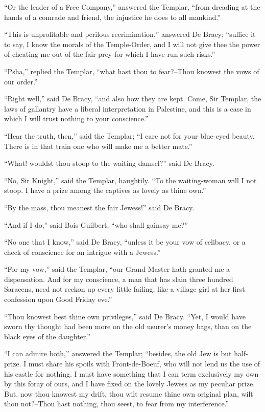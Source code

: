 ``Or the leader of a Free Company,'' answered the Templar, ``from
dreading at the hands of a comrade and friend, the injustice he does to
all mankind.''

``This is unprofitable and perilous recrimination,'' answered De Bracy;
``suffice it to say, I know the morals of the Temple-Order, and I will
not give thee the power of cheating me out of the fair prey for which I
have run such risks.''

``Psha,'' replied the Templar, ``what hast thou to fear?--Thou knowest
the vows of our order.''

``Right well,'' said De Bracy, ``and also how they are kept. Come, Sir
Templar, the laws of gallantry have a liberal interpretation in
Palestine, and this is a case in which I will trust nothing to your
conscience.''

``Hear the truth, then,'' said the Templar; ``I care not for your
blue-eyed beauty. There is in that train one who will make me a better
mate.''

``What! wouldst thou stoop to the waiting damsel?'' said De Bracy.

``No, Sir Knight,'' said the Templar, haughtily. ``To the waiting-woman
will I not stoop. I have a prize among the captives as lovely as thine
own.''

``By the mass, thou meanest the fair Jewess!'' said De Bracy.

``And if I do,'' said Bois-Guilbert, ``who shall gainsay me?''

``No one that I know,'' said De Bracy, ``unless it be your vow of
celibacy, or a check of conscience for an intrigue with a Jewess.''

``For my vow,'' said the Templar, ``our Grand Master hath granted me a
dispensation. And for my conscience, a man that has slain three hundred
Saracens, need not reckon up every little failing, like a village girl
at her first confession upon Good Friday eve.''

``Thou knowest best thine own privileges,'' said De Bracy. ``Yet, I
would have sworn thy thought had been more on the old usurer's money
bags, than on the black eyes of the daughter.''

``I can admire both,'' answered the Templar; ``besides, the old Jew is
but half-prize. I must share his spoils with Front-de-Boeuf, who will
not lend us the use of his castle for nothing. I must have something
that I can term exclusively my own by this foray of ours, and I have
fixed on the lovely Jewess as my peculiar prize. But, now thou knowest
my drift, thou wilt resume thine own original plan, wilt thou not?--Thou
hast nothing, thou seest, to fear from my interference.''

